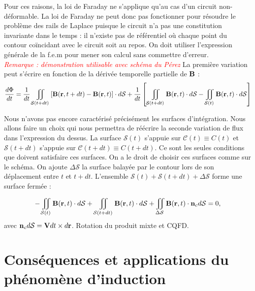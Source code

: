 \documentclass[11pt,a4paper]{report}
\begin{document}
	Pour ces raisons, la loi de Faraday ne s'applique qu'au cas d'un circuit non-déformable. La loi de Faraday ne peut donc pas fonctionner pour résoudre le problème des rails de Laplace puisque le circuit n'a pas une constitution invariante dans le temps : il n'existe pas de référentiel où chaque point du contour coïncidant avec le circuit soit au repos. On doit utiliser l'expression générale de la f.e.m pour mener son calcul sans commettre d'erreur.\\
		
	\textit{\textcolor{red}{Remarque : démonstration utilisable avec schéma du Pérez}}
	La première variation peut s'écrire en fonction de la dérivée temporelle partielle de $\bold{B}$ :
	\begin{equation}
		\frac{d\Phi}{dt} 
		= \frac{1}{dt}\iint_{\mathcal{S}(t+dt)}\left[\bold{B}(\bold{r},t+dt)-\bold{B}(\bold{r},t)\right]\cdot d\bold{\mathcal{S}} 
			+ \frac{1}{dt}\left[\iint_{\mathcal{S}(t+dt)}\bold{B}(\bold{r},t)\cdot d\bold{\mathcal{S}}
		    - \iint_{\mathcal{S}(t)}\bold{B}(\bold{r},t)\cdot d\bold{\mathcal{S}}\right]
	\end{equation}
		
	Nous n'avons pas encore caractérisé précisément les surfaces d'intégration. Nous allons faire un choix qui nous permettra de réécrire la seconde variation de flux dans l'expression du dessus. La surface $\mathcal{S}(t)$ s'appuie sur $\mathcal{C}(t) \equiv C(t)$ et $\mathcal{S}(t+dt)$ s'appuie sur $\mathcal{C}(t+dt) \equiv C(t+dt)$. Ce sont les seules conditions que doivent satisfaire ces surfaces. On a le droit de choisir ces surfaces comme sur le schéma. On ajoute $\Delta \mathcal{S}$ la surface balayée par le contour lors de son déplacement entre $t$ et $t+dt$. L'ensemble $\mathcal{S}(t) + \mathcal{S}(t+dt) + \Delta\mathcal{S}$ forme une surface fermée :

	\begin{equation}
		-\iint_{\mathcal{S}(t)}\bold{B}(\bold{r},t)\cdot d\bold{\mathcal{S}} + \iint_{\mathcal{S}(t+dt)}\bold{B}(\bold{r},t)\cdot d\bold{\mathcal{S}} + \iint_{\Delta \mathcal{S}}\bold{B}(\bold{r},t)\cdot \bold{n}_c d\mathcal{S} = 0,	
	\end{equation}
	avec $\bold{n}_c d\mathcal{S} = \bold{V}dt\times d\bold{r}$. Rotation du produit mixte et CQFD.
	
\newpage
\section{Conséquences et applications du phénomène d'induction}
\end{document}
